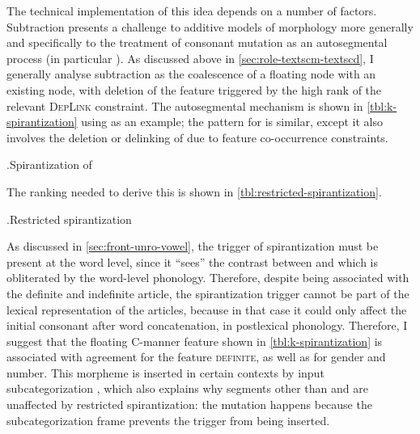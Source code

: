 The technical implementation of this idea depends on a number of factors. Subtraction presents a challenge to additive models of morphology more generally and specifically to the treatment of consonant mutation as an autosegmental process (\cf in particular \citealp{green2003,greenbook}). As discussed above in \cref{sec:role-textscm-textscd}, I generally analyse subtraction as the coalescence of a floating node with an existing node, with deletion of the feature triggered by the high rank of the relevant \textsc{DepLink} constraint. The autosegmental mechanism is shown in  \cref{tbl:k-spirantization} using \ipa{[k]} as an example; the pattern for \ipa{[ʧ]} is similar, except it also involves the deletion or delinking of  due to feature co\hyp occurrence constraints.

\ex.\label{tbl:k-spirantization}Spirantization of \ipa{[k]}\\

The ranking needed to derive this is shown in \ref{tbl:restricted-spirantization}.

\ex.\label{tbl:restricted-spirantization}Restricted spirantization\setlength\level{8mm}\\
\wraptbl{}

As discussed in \cref{sec:front-unro-vowel}, the trigger of spirantization must be present at the word level, since it \enquote{sees} the contrast between \ipa{[kj]} and \ipa{[ʧ]} which is obliterated by the word\hyp level phonology. Therefore, despite being associated with the definite and indefinite article, the spirantization trigger cannot be part of the lexical representation of the articles, because in that case it could only affect the initial consonant after word concatenation, \ie in postlexical phonology. Therefore, I suggest that the floating C-manner feature shown in \ref{tbl:k-spirantization} is associated with agreement for the feature \textsc{definite}, as well as for gender and number. This morpheme is inserted in certain contexts by input subcategorization \citep{paster06:_phonol,bye-allomorphy,yu07}, which also explains why segments other than \ipa{[k]} and \ipa{[ʧ]} are unaffected by restricted spirantization: the mutation happens because the subcategorization frame prevents the trigger from being inserted.

